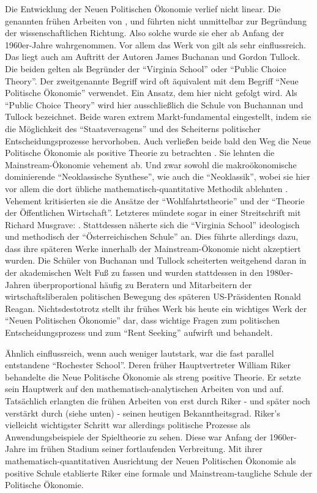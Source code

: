 Die Entwicklung der Neuen Politischen Ökonomie verlief nicht linear. Die genannten frühen Arbeiten von \textcite{Arrow1951}, \textcite{Black1948a} und \textcite{Downs1957} führten nicht unmittelbar zur Begründung der wissenschaftlichen Richtung. Also solche wurde sie eher ab Anfang der 1960er-Jahre wahrgenommen. Vor allem das Werk von \textcite{Buchanan1962} gilt als sehr einflussreich. Das liegt auch am Auftritt der Autoren James Buchanan und Gordon Tullock. Die beiden gelten als Begründer der "`Virginia School"' oder "`Public Choice Theory"'. Der zweitgenannte Begriff wird oft äquivalent mit dem Begriff "`Neue Politische Ökonomie"' verwendet. Ein Ansatz, dem hier nicht gefolgt wird. Als "`Public Choice Theory"' wird hier ausschließlich die Schule von Buchannan und Tullock bezeichnet. Beide waren extrem Markt-fundamental eingestellt, indem sie die Möglichkeit des "`Staatsversagens"' und des Scheiterns politischer Entscheidungsprozesse hervorhoben. Auch verließen beide bald den Weg die Neue Politische Ökonomie als positive Theorie zu betrachten \parencite[S. 105]{Mitchell1988}. Sie lehnten die Mainstream-Ökonomie vehement ab. Und zwar sowohl die makroökonomische dominierende "`Neoklassische Synthese"', wie auch die "`Neoklassik"', wobei sie hier vor allem die dort übliche mathematisch-quantitative Methodik ablehnten \parencite[S. 106]{Mitchell1988}. Vehement kritisierten sie die Ansätze der "`Wohlfahrtstheorie"' und der "`Theorie der Öffentlichen Wirtschaft"'. Letzteres mündete sogar in einer Streitschrift mit Richard Musgrave: \textcite{Musgrave1999}. Stattdessen näherte sich die "`Virginia School"' ideologisch und methodisch der "`Österreichischen Schule"' an. Dies führte allerdings dazu, dass ihre späteren Werke innerhalb der Mainstream-Ökonomie nicht akzeptiert wurden. Die Schüler von Buchanan und Tullock scheiterten weitgehend daran in der akademischen Welt Fuß zu fassen und wurden stattdessen in den 1980er-Jahren überproportional häufig zu Beratern und Mitarbeitern der wirtschaftsliberalen politischen Bewegung des späteren US-Präsidenten Ronald Reagan. Nichtsdestotrotz stellt ihr frühes Werk bis heute ein wichtiges Werk der "`Neuen Politischen Ökonomie"' dar, dass wichtige Fragen zum politischen Entscheidungsprozess  und zum "`Rent Seeking"' aufwirft und behandelt.

Ähnlich einflussreich, wenn auch weniger lautstark, war die fast parallel entstandene "`Rochester School"'. Deren früher Hauptvertreter William Riker behandelte die Neue Politische Ökonomie als streng positive Theorie. Er setzte sein Hauptwerk \parencite{Riker1962} auf den mathematisch-analytischen Arbeiten von \textcite{Black1948a} und \textcite{Arrow1951} auf. Tatsächlich erlangten die frühen Arbeiten von \textcite{Black1948a, Black1948b} erst durch Riker - und später noch verstärkt durch \textcite{Nordhaus1975} (siehe unten) - seinen heutigen Bekanntheitsgrad. Riker's vielleicht wichtigster Schritt war allerdings politische Prozesse als Anwendungsbeispiele der Spieltheorie zu sehen. Diese war Anfang der 1960er-Jahre im frühen Stadium seiner fortlaufenden Verbreitung. Mit ihrer mathematisch-quantitativen Ausrichtung der Neuen Politischen Ökonomie als positive Schule etablierte Riker eine formale und Mainstream-taugliche Schule der Politische Ökonomie.

